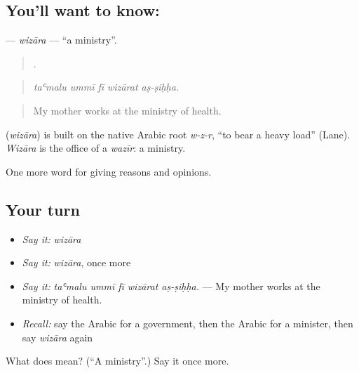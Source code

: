 \subsection*{You'll want to know: }
\textbf{} — \emph{wizāra} — \textquotedblleft{}a ministry\textquotedblright{}.

\begin{quote}
    .
\end{quote}

\begin{quote}
\emph{taʿmalu ummī fī wizārat aṣ-ṣiḥḥa.}
\end{quote}

\begin{quote}
My mother works at the ministry of health.
\end{quote}

\begin{cousinweb}
\textbf{} (\emph{wizāra}) is built on the native Arabic root \emph{w-z-r}, \textquotedblleft{}to bear a heavy load\textquotedblright{} (Lane). \emph{Wizāra} is the office of a \emph{wazīr}: a ministry.
\end{cousinweb}

\begin{grammarlens}[title={What you've built}]
One more word for giving reasons and opinions.
\end{grammarlens}

\subsection*{Your turn}
\begin{itemize}
\raggedright
  \item \emph{Say it:} \emph{wizāra}
  \item \emph{Say it:} \emph{wizāra}, once more
  \item \emph{Say it:} \emph{taʿmalu ummī fī wizārat aṣ-ṣiḥḥa.} — My mother works at the ministry of health.
  \item \emph{Recall:} say the Arabic for a government, then the Arabic for a minister, then say \emph{wizāra} again
\end{itemize}

\begin{tcolorbox}[breakable,colback=teal!4,colframe=teal!35!black,title={Before you move on}]
What does  mean? (\textquotedblleft{}A ministry\textquotedblright{}.) Say it once more.
\end{tcolorbox}
